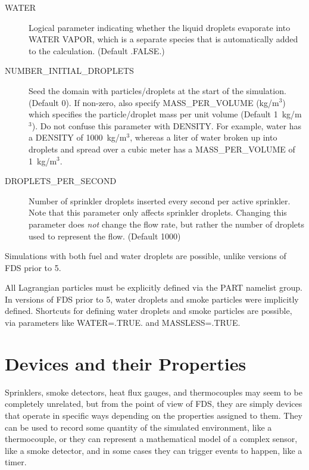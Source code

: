 \documentclass[11pt]{book}
\begin{document}
\begin{description}
\item[{\ct WATER}] Logical parameter indicating whether the liquid droplets evaporate
into {\ct WATER VAPOR}, which is a separate species that is automatically added to the calculation. (Default {\ct .FALSE.})
   \item[{\ct NUMBER\_INITIAL\_DROPLETS}]
Seed the domain with particles/droplets at the start of the simulation.
(Default 0). If non-zero, also specify {\ct MASS\_PER\_VOLUME} (kg/m$^3$) which
specifies the particle/droplet mass per unit volume (Default 1~kg/m$^3$). Do
not confuse this parameter with {\ct DENSITY}. For example, water has a
{\ct DENSITY} of 1000~kg/m$^3$, whereas a liter of water broken up into droplets
and spread over a cubic meter has a {\ct MASS\_PER\_VOLUME} of 1~kg/m$^3$.
\item[{\ct DROPLETS\_PER\_SECOND}]  Number of sprinkler droplets inserted every
second per active sprinkler. Note that this parameter only affects sprinkler
droplets. Changing this parameter does {\em not} change the flow rate, but rather the number
of droplets used to represent the flow. (Default 1000)
\end{description}

\begin{warning}
Simulations with both fuel and water droplets are possible, unlike versions of FDS prior to 5.
\end{warning}

\begin{warning}
All Lagrangian particles must be explicitly defined via the {\ct PART} namelist group. In versions of FDS prior to 5, water droplets and
smoke particles were implicitly defined. Shortcuts for defining water droplets and smoke particles are possible, via parameters like
{\ct WATER=.TRUE.} and {\ct MASSLESS=.TRUE.}
\end{warning}





\clearpage
\section{Devices and their Properties}

Sprinklers, smoke detectors, heat flux gauges, and thermocouples
may seem to be completely unrelated, but from the point of view
of FDS, they are simply devices that operate in specific ways depending
on the properties assigned to them. They can be used to record some
quantity of the simulated environment, like a thermocouple, or they can represent a mathematical model
of a complex sensor, like a smoke detector,
and in some cases they can trigger events to happen, like a timer.
\end{document}
